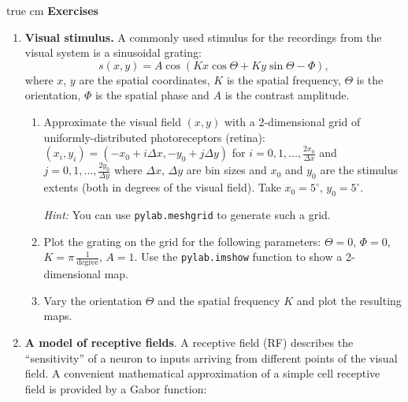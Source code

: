 \documentclass[12pt, a4]{article}
\begin{document}
 true cm
{\bf Exercises}
\begin{enumerate}

    \item \textbf{Visual stimulus.} A commonly used stimulus for the recordings from the visual
        system is a sinusoidal grating:
        \begin{equation}
            s(x, y) = A \cos(Kx\cos\Theta + Ky\sin\Theta
            -\Phi),
            \label{eq:grating}
        \end{equation}
        where $x$, $y$ are the spatial coordinates, $K$ is the spatial
        frequency, $\Theta$ is the orientation,  $\Phi$ is the spatial
        phase and $A$ is the contrast amplitude.

        \begin{enumerate}
            \item Approximate the visual field $(x,y)$ with a
                2-dimensional grid of uniformly-distributed
                photoreceptors (retina):
                $(x_i, y_i)= (-x_0+i\Delta x, -y_0+j\Delta y)$ for
                $i=0,1,\dots, \frac{2x_0}{\Delta x}$ and $j=0,1,\dots,
                \frac{2y_0}{\Delta y}$ where $\Delta x$, $\Delta y$
                are bin sizes and $x_0$ and $y_0$ are the
                stimulus extents (both in degrees of the visual field). Take
                $x_0=5^\circ$, $y_0=5^\circ$.
                
                \textit{Hint:} You can use
                \texttt{pylab.meshgrid} to generate such a grid. 
            \item \label{ex:grating} Plot the grating on the
                grid for the following parameters: $\Theta=0$,
                $\Phi=0$, $K=\pi\,\frac{1}{\mathrm{degree}}$, $A=1$.  Use the 
                \texttt{pylab.imshow} function to show a 2-dimensional map. 
            \item \label{ex:varygrating}Vary the orientation $\Theta$ and the
                spatial frequency $K$ and plot the resulting maps.
        \end{enumerate}

    \item \textbf{A model of receptive fields}.  A receptive field (RF)
                describes the ``sensitivity'' of a neuron to inputs arriving from
                different points of the visual field. A convenient mathematical
                approximation of a simple cell receptive field is provided by a
                Gabor function:


\end{enumerate}
\end{document}
